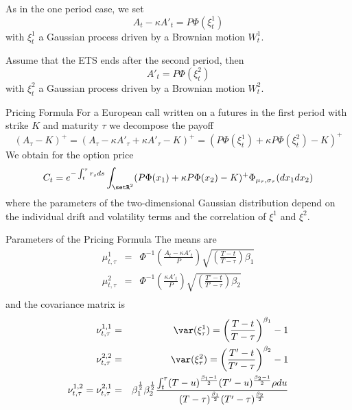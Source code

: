 
	As in the one period case,  we set
$$
A_t-\kappa A'_t = P \Phi(\xi_t^1)
$$
with $\xi^1_t$ a Gaussian process driven by a Brownian motion $W^1_t$.

	Assume that the ETS ends after the second period, then
$$
A'_t = P \Phi(\xi^2_t)
$$
with $\xi^2_t$ a Gaussian process driven by a Brownian motion $W^2_t$.


{Pricing Formula}
For a European call written on a futures in the first period with strike $K$ and maturity $\tau$ we decompose the payoff
$$
(A_\tau-K)^+= (A_\tau - \kappa A'_\tau + \kappa A'_\tau -K )^+= (P\Phi(\xi^1_t) + \kappa P \Phi(\xi_t^2) -K)^+
$$
We obtain for the option price
$$
C_t = e^{-\int_t^\tau r_s ds} \int_{\setR^2} (P\Phi(x_1)+\kappa P \Phi(x_2) -K)^+ \Phi_{\mu_\tau, \sigma_\tau}(dx_1dx_2)
$$
where the parameters of the two-dimensional Gaussian distribution depend on the individual drift and volatility terms and the correlation
of $\xi^1$ and $\xi^2$.

{Parameters of the Pricing Formula}
The means are
\begin{eqnarray}\nonumber
\mu^1_{t,\tau} &=& \Phi^{-1}\left(\frac{A_t - \kappa A'_t}{P}\right) \sqrt{\left(\frac{T-t}{T-\tau}\right)\beta_1}\\\nonumber
\mu^2_{t,\tau} &=& \Phi^{-1}\left(\frac{\kappa A'_t}{P}\right) \sqrt{\left(\frac{T'-t}{T'-\tau}\right)\beta_2}\\\nonumber
\end{eqnarray}
and the covariance matrix is
\begin{eqnarray}\nonumber
\nu^{1,1}_{t,\tau} &=& \var(\xi_\tau^1) =  \left(\frac{T-t}{T-\tau}\right)^{\beta_1}-1\\\nonumber
\nu^{2,2}_{t,\tau} &=& \var(\xi_\tau^2) =  \left(\frac{T'-t}{T'-\tau}\right)^{\beta_2}-1\\\nonumber
\nu^{1,2}_{t,\tau}= \nu^{2,1}_{t,\tau} &=& \beta_1^\frac{1}{2}\beta_2^\frac{1}{2}
\frac{\int_t^\tau (T-u)^\frac{\beta_1-1}{2} (T'-u)^\frac{\beta_2-1}{2} \rho du}{(T-\tau)^\frac{\beta_1}{2} (T'-\tau)^\frac{\beta_2}{2}} \\\nonumber
\end{eqnarray}
